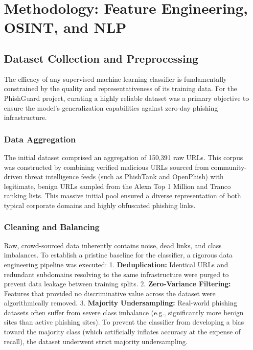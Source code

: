 \chapter{Methodology: Feature Engineering, OSINT, and NLP}
\label{chapter-4-feature-engineering-and-ml-model}

\section{Dataset Collection and
Preprocessing}\label{dataset-collection-and-preprocessing}

The efficacy of any supervised machine learning classifier is
fundamentally constrained by the quality and representativeness of its
training data. For the PhishGuard project, curating a highly reliable
dataset was a primary objective to ensure the model's generalization
capabilities against zero-day phishing infrastructure.

\subsection{Data Aggregation}\label{data-aggregation}

The initial dataset comprised an aggregation of 150,391 raw URLs. This
corpus was constructed by combining verified malicious URLs sourced from
community-driven threat intelligence feeds (such as PhishTank and
OpenPhish) with legitimate, benign URLs sampled from the Alexa Top 1
Million and Tranco ranking lists. This massive initial pool ensured a
diverse representation of both typical corporate domains and highly
obfuscated phishing links.

\subsection{Cleaning and Balancing}\label{cleaning-and-balancing}

Raw, crowd-sourced data inherently contains noise, dead links, and class
imbalances. To establish a pristine baseline for the classifier, a
rigorous data engineering pipeline was executed: 1.
\textbf{Deduplication:} Identical URLs and redundant subdomains
resolving to the same infrastructure were purged to prevent data leakage
between training splits. 2. \textbf{Zero-Variance Filtering:} Features
that provided no discriminative value across the dataset were
algorithmically removed. 3. \textbf{Majority Undersampling:} Real-world
phishing datasets often suffer from severe class imbalance (e.g.,
significantly more benign sites than active phishing sites). To prevent
the classifier from developing a bias toward the majority class (which
artificially inflates accuracy at the expense of recall), the dataset
underwent strict majority undersampling.

